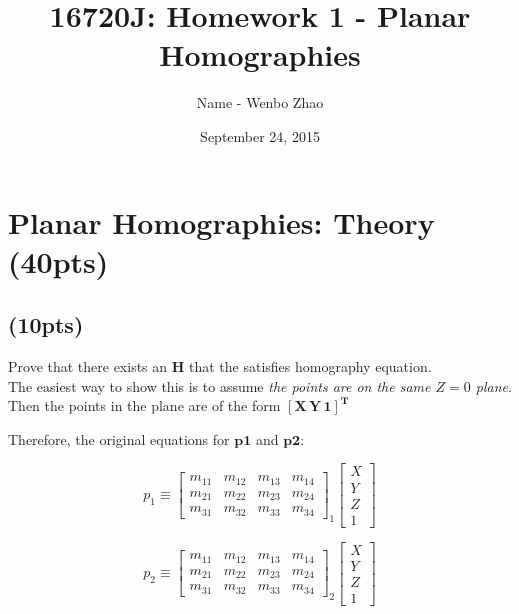 \documentclass[12pt]{article}
\begin{document}
\title{16720J: Homework 1 - Planar Homographies}

\author{Name - Wenbo Zhao}

\date{September 24, 2015}

\maketitle

\setcounter{section}{2}

\section{Planar Homographies: Theory (40pts)}

\subsection{(10pts)}

Prove that there exists an $\bm{ H}$ that the satisfies homography equation.
\\
The easiest way to show this is to assume \emph{the points are on the same $Z=0$ plane}. Then the points in the plane are of the form $\bm{[X\,Y\,1]^T}$

Therefore, the original equations for $\bm{p1}$ and $\bm{p2}$:

\begin{equation}
  p_1 \equiv \left[ \begin{matrix}
      m_{11} & m_{12} & m_{13} & m_{14} \\
      m_{21} & m_{22} & m_{23} & m_{24} \\
      m_{31} & m_{32} & m_{33} & m_{34}
    \end{matrix} \right]_1
\left[ \begin{matrix}
X\\
Y\\
Z\\
1
\end{matrix} \right]
\end{equation}

\begin{equation}
  p_2 \equiv \left[ \begin{matrix}
      m_{11} & m_{12} & m_{13} & m_{14} \\
      m_{21} & m_{22} & m_{23} & m_{24} \\
      m_{31} & m_{32} & m_{33} & m_{34}
    \end{matrix} \right]_2
\left[ \begin{matrix}
X\\
Y\\
Z\\
1
\end{matrix} \right]
\end{equation}
\end{document}
